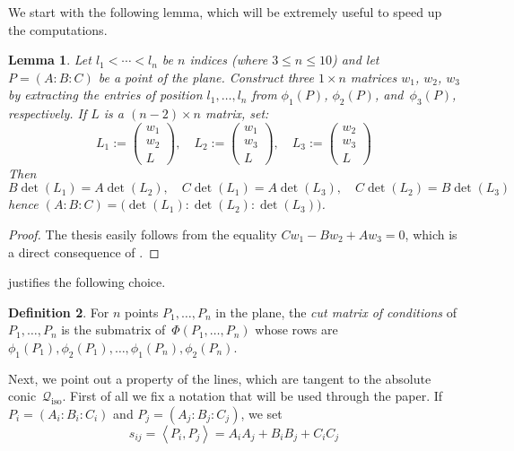 \documentclass{amsart}
\theoremstyle{plain}
\newtheorem{lemma}{Lemma}[section]
\theoremstyle{definition}
\newtheorem{definition}[lemma]{Definition}
\newcommand{\iso}{\mathcal{Q}_{\mathrm{iso}}}
\newcommand{\scl}[2]{\left\langle {#1}, {#2} \right\rangle}
\begin{document}
We start with the following lemma, which will be extremely useful
to speed up the computations.

\begin{lemma}
\label{lemma:minors}
Let $l_1 < \cdots <l_n$ be $n$ indices (where $3 \leq n \leq 10$) and let $P = (A: B: C)$ be a point of the plane.
Construct three $1 \times n$ matrices $w_1$, $w_2$, $w_3$ by extracting the entries of position $l_1, \dotsc, l_n$ from $\phi_1(P)$, $\phi_2(P)$, and~$\phi_3(P)$, respectively. If $L$ is a $(n-2) \times n$ matrix, set:
  \[
  L_1 := \left(\begin{array}{c}w_1 \\ w_2 \\ L\end{array}  \right), \quad
  L_2 := \left(\begin{array}{c}w_1 \\ w_3 \\ L\end{array}  \right), \quad
  L_3 := \left(\begin{array}{c}w_2 \\ w_3 \\ L\end{array}  \right)
  \]
  Then
  \[
  B \det(L_1) = A \det(L_2), \quad
  C \det(L_1) = A \det(L_3), \quad
  C \det(L_2) = B \det(L_3)
  \]
  hence $(A: B: C) = \bigl( \det(L_1): \det(L_2): \det(L_3) \bigr)$.
\end{lemma}
\begin{proof}
  The thesis easily follows from the equality $C w_1 - B w_2 + A w_3 = 0$, which is a direct consequence of .
\end{proof}

 justifies the following choice.

\begin{definition}
 \label{definition:reduced_matrix_conditions}
 For $n$ points $P_1, \dotsc, P_n$ in the plane, the \emph{cut matrix of conditions} of $P_1, \dotsc, P_n$ is the submatrix of~$\Phi(P_1, \dotsc, P_n)$ whose rows are $\phi_1(P_1), \phi_2(P_1), \dotsc, \phi_1(P_n), \phi_2(P_n)$.
\end{definition}

Next, we point out a property of the lines, which are tangent to the absolute conic~$\iso$.
First of all we fix a notation that will be used through the paper. If
$P_i = (A_i: B_i: C_i)$ and $P_j = (A_j: B_j: C_j)$, we set
\[
s_{ij} = \scl{P_i}{P_j} = A_i A_j + B_i B_j + C_i C_j
\]
\end{document}
